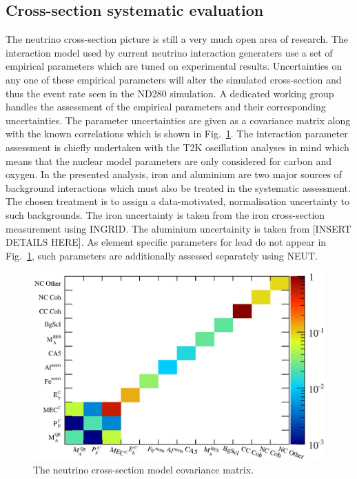 \subsection{Cross-section systematic evaluation}
\label{subsec:CrossSectionSystematic}
The neutrino cross-section picture is still a very much open area of research.  The interaction model used by current neutrino interaction generaters use a set of empirical parameters which are tuned on experimental results.  Uncertainties on any one of these empirical parameters will alter the simulated cross-section and thus the event rate seen in the ND280 simulation.  A dedicated working group handles the assessment of the empirical parameters and their corresponding uncertainties.  The parameter uncertainties are given as a covariance matrix along with the known correlations which is shown in Fig.~\ref{fig:XSecPredictionSyst}.  The interaction parameter assessment is chiefly undertaken with the T2K oscillation analyses in mind which means that the nuclear model parameters are only considered for carbon and oxygen.  In the presented analysis, iron and aluminium are two major sources of background interactions which must also be treated in the systematic assessment.  The chosen treatment is to assign a data-motivated, normalisation uncertainty to such backgrounds.  The iron uncertainty is taken from the iron cross-section measurement using INGRID.  The aluminium uncertainity is taken from [INSERT DETAILS HERE].  As element specific parameters for lead do not appear in Fig.~\ref{fig:XSecPredictionSyst}, such parameters are additionally assessed separately using NEUT.
\begin{figure}
  \centering
  \includegraphics[width=12cm]{images/measurement/systematics/xsec/xsec_prediction_syst.eps}
  \caption{The neutrino cross-section model covariance matrix.}
  \label{fig:XSecPredictionSyst}
\end{figure}
